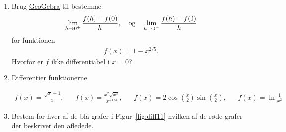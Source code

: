 \begin{enumerate}
	\item Brug \href{https://www.geogebra.org/m/eTmzBFEq}{GeoGebra} til bestemme 
	\begin{align*}
	\lim_{h\to 0^+} \frac{f(h)-f(0)}{h},\quad \textup{og}\quad \lim_{h\to 0^-} \frac{f(h)-f(0)}{h}
	\end{align*}
	 for funktionen
	\begin{align*}
	f(x)=1-x^{2/5}.
	\end{align*}
	Hvorfor er $f$ ikke differentiabel i $x=0$?
	
	\item Differentier funktionerne
	
	\begin{align*}
		f(x)=\frac{\sqrt{x}+1}{x},&& f(x)=\frac{x^2\sqrt{x^3}}{x^{-1/4}},&& f(x)=2\cos(\frac{x}{2})\sin(\frac{x}{2}),&&f(x)=\ln\frac{1}{x^2}
	\end{align*}
	
	

	
	\item \label{it:diff11} Bestem for hver af de blå grafer i Figur~\ref{fig:diff11} hvilken af de røde grafer der beskriver den afledede.
		\begin{figure}
		\centering
		

\end{figure}
\end{enumerate}
